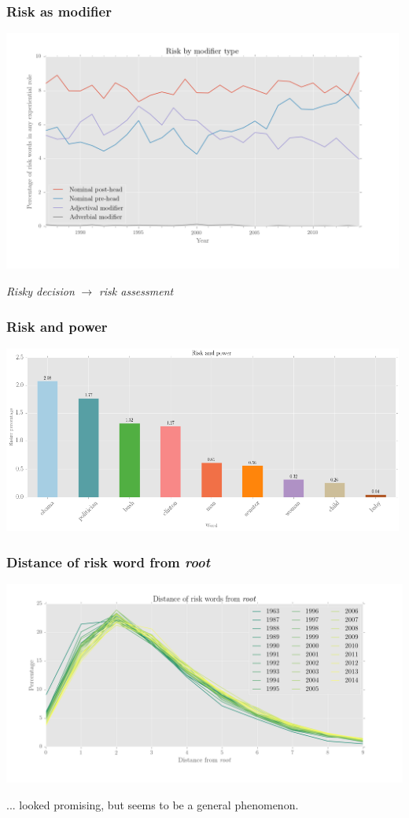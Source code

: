 \documentclass{beamer}       %
\begin{document}
\begin{frame}
    \frametitle{Risk as modifier}
    \centering
    \includegraphics[width=0.99\textwidth]{../../images/risk_by_mod_type_colour}

    \noindent \emph{Risky decision} $\rightarrow$ \emph{risk assessment}
\end{frame}

\begin{frame}
    \frametitle{Risk and power}
    \centering
    \includegraphics[width=0.99\textwidth]{../../images/risk-and-power-2}
\end{frame}

\begin{frame}
    \frametitle{Distance of risk word from \emph{root}}
    \centering
    \includegraphics[width=1\textwidth]{../../images/distance-of-risk-words-from-root}

    ... looked promising, but seems to be a general phenomenon.
\end{frame}
\end{document}

